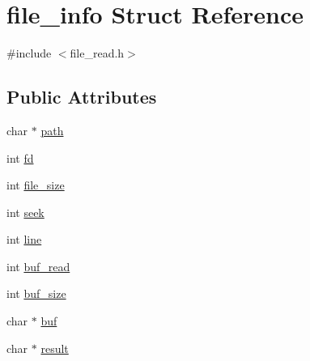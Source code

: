 \hypertarget{structfile__info}{\section{file\+\_\+info Struct Reference}
\label{structfile__info}
}


{\ttfamily \#include $<$file\+\_\+read.\+h$>$}

\subsection*{Public Attributes}
\begin{DoxyCompactItemize}
\item 
char $\ast$ \hyperlink{structfile__info_a031658e6d1a3906f23b26a88e05ce6d0}{path}
\item 
int \hyperlink{structfile__info_adccdbed71e76da97a23be347de511f42}{fd}
\item 
int \hyperlink{structfile__info_a3b73a528a567708069aae452c21290f2}{file\+\_\+size}
\item 
int \hyperlink{structfile__info_a8906d485cfe0e1095b3ed0e35c6e7506}{seek}
\item 
int \hyperlink{structfile__info_ab0c900c50eef067aed0a257b218e5396}{line}
\item 
int \hyperlink{structfile__info_a5e7cd4b63da2cf9f297b68adfc1b5b99}{buf\+\_\+read}
\item 
int \hyperlink{structfile__info_a29a3f8faa143e2c82fbd793dd49c6cd6}{buf\+\_\+size}
\item 
char $\ast$ \hyperlink{structfile__info_a2094ce0046c07f521ada8f1247280d95}{buf}
\item 
char $\ast$ \hyperlink{structfile__info_a0b17a1cbdb96ab198326c6073c862fe1}{result}
\end{DoxyCompactItemize}


